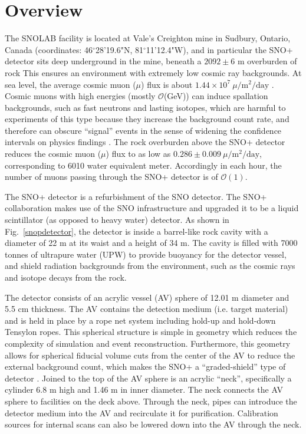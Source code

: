
\section{Overview}\label{sect:overview}

The SNOLAB facility is located at Vale's Creighton mine in Sudbury, Ontario, Canada (coordinates: 46$^\circ$28'19.6"N, 81$^\circ$11'12.4"W), and in particular the SNO+ detector sits deep underground in the mine, beneath a $2092\pm6$ m overburden of rock\cite{snolabuserhandbook,snop_jinst} This ensures an environment with extremely low cosmic ray backgrounds. At sea level, the average cosmic muon ($\mu$) flux is about $1.44\times 10^7~\mu/\mathrm{m^2/day}$ \cite{muonflux}. Cosmic muons with high energies (mostly $\mathcal{O}$(GeV)) can induce spallation backgrounds, such as fast neutrons and lasting isotopes, which are harmful to experiments of this type because they increase the background count rate, and therefore can obscure ``signal'' events in the sense of widening the confidence intervals on physics findings \cite{beacom2017physics}. The rock overburden above the SNO+ detector reduces the cosmic muon ($\mu$) flux to as low as $0.286\pm0.009~\mu/\mathrm{m^2/day}$, corresponding to 6010 water equivalent meter\cite{snop_jinst}. Accordingly in each hour, the number of muons passing through the SNO+ detector is of $\mathcal{O}(1)$.

The SNO+ detector is a refurbishment of the SNO detector. The SNO+ collaboration makes use of the SNO infrastructure and upgraded it to be a liquid scintillator (as opposed to heavy water) detector. As shown in Fig.~\ref{snopdetector}, the detector is inside a barrel-like rock cavity with a diameter of 22 m at its waist and a height of 34 m. The cavity is filled with 7000 tonnes of ultrapure water (UPW) to provide buoyancy for the detector vessel, and shield radiation backgrounds from the environment, such as the cosmic rays and isotope decays from the rock. 

The detector consists of an acrylic vessel (AV) sphere of 12.01 m diameter and 5.5 cm thickness. The AV contains the detection medium (i.e. target material) and is held in place by a rope net system including hold-up and hold-down Tensylon ropes. This spherical structure is simple in geometry which reduces the complexity of simulation and event reconstruction. Furthermore, this geometry allows for spherical fiducial volume cuts from the center of the AV to reduce the external background count, which makes the SNO+ a ``graded-shield'' type of detector \cite{waterfield2017optical}.
Joined to the top of the AV sphere is an acrylic ``neck'', specifically a cylinder 6.8 m high and 1.46 m in inner diameter. The neck connects the AV sphere to facilities on the deck above. Through the neck, pipes can introduce the detector medium into the AV and recirculate it for purification. Calibration sources for internal scans can also be lowered down into the AV through the neck.

